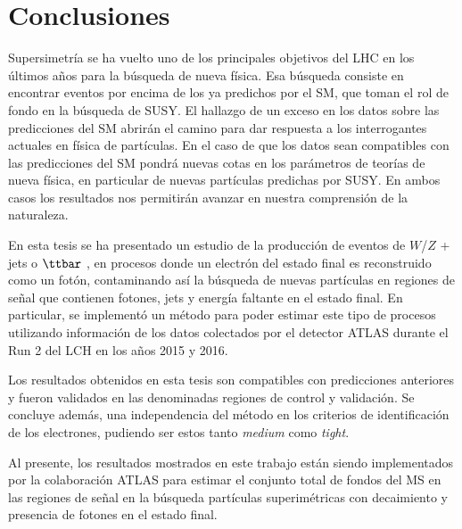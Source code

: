 \chapter{Conclusiones}

Supersimetría se ha vuelto uno de los principales objetivos del LHC en los últimos años para la búsqueda de nueva física. Esa búsqueda consiste en encontrar eventos por encima de los ya predichos por el SM, que toman el rol de fondo en la búsqueda de SUSY. El hallazgo de un exceso en los datos sobre las predicciones del SM abrirán el camino para dar respuesta a los interrogantes actuales en física de partículas. En el caso de que los datos sean compatibles con las predicciones del SM pondrá nuevas cotas en los parámetros de teorías de nueva física, en particular de nuevas partículas predichas por SUSY. En ambos casos los resultados nos permitirán avanzar en nuestra comprensión de la naturaleza. 

En esta tesis se ha presentado un estudio de la producción de eventos de $W$/$Z$ + jets o $\ttbar$ , en procesos donde un electrón del estado final es reconstruido como un fotón, contaminando así la búsqueda de nuevas partículas en regiones de señal que contienen fotones, jets y energía faltante en el estado final. En particular, se implementó un método para poder estimar este tipo de procesos utilizando información de los datos colectados por el detector ATLAS durante el Run 2 del LCH en los años 2015 y 2016.

Los resultados obtenidos en esta tesis son compatibles con predicciones anteriores  y fueron validados en las denominadas regiones de control y validación. Se concluye además, una independencia del método en los criterios de identificación de los electrones, pudiendo ser estos tanto \textit{medium} como \textit{tight}.

Al presente, los resultados mostrados en este trabajo están siendo implementados por la colaboración ATLAS para estimar el conjunto total de fondos del MS en las regiones de señal en la búsqueda partículas superimétricas con decaimiento y presencia de fotones en el estado final.
